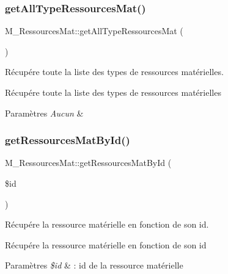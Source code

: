 \subsubsection{\texorpdfstring{get\+All\+Type\+Ressources\+Mat()}{getAllTypeRessourcesMat()}}
{\footnotesize\ttfamily M\+\_\+\+Ressources\+Mat\+::get\+All\+Type\+Ressources\+Mat (\begin{DoxyParamCaption}{ }\end{DoxyParamCaption})}



Récupére toute la liste des types de ressources matérielles. 

Récupére toute la liste des types de ressources matérielles 
\begin{DoxyParams}{Paramètres}
{\em Aucun} & \\
\hline
\end{DoxyParams}
\mbox{\label{class_m___ressources_mat_a5907518ad69b7325e50a7b972569ff97}} 
\subsubsection{\texorpdfstring{get\+Ressources\+Mat\+By\+Id()}{getRessourcesMatById()}}
{\footnotesize\ttfamily M\+\_\+\+Ressources\+Mat\+::get\+Ressources\+Mat\+By\+Id (\begin{DoxyParamCaption}\item[{}]{\$id }\end{DoxyParamCaption})}



Récupére la ressource matérielle en fonction de son id. 

Récupére la ressource matérielle en fonction de son id 
\begin{DoxyParams}{Paramètres}
{\em \$id} & \+: id de la ressource matérielle \\
\hline
\end{DoxyParams}
\mbox{\label{class_m___ressources_mat_af8fff51a4e63987b2624c6e5f749dd76}} 
